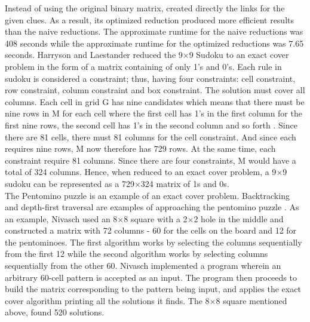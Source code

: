 \documentclass[a4paper,oneside,11pt]{report}
\begin{document}
	Instead of using the original binary matrix, \cite{Harrysson} created directly the links for the given clues. As a result, its optimized reduction produced more efficient results than the naive reductions. The approximate runtime for the naive reductions was 408 seconds while the approximate runtime for the optimized reductions was 7.65 seconds. Harryson and Laestander reduced the 9$\times$9 Sudoku to an exact cover problem in the form of a matrix containing of only 1’s and 0’s. Each rule in sudoku is considered a constraint; thus, having four constraints: cell constraint, row constraint, column constraint and box constraint. The solution must cover all columns. Each cell in grid G has nine candidates which means that there must be nine rows in M for each cell where the first cell has 1’s in the first column for the first nine rows, the second cell has 1’s in the second column and so forth \cite{Harrysson}. Since there are 81 cells, there must 81 columns for the cell constraint. And since each requires nine rows, M now therefore has 729 rows. At the same time, each constraint require 81 columns. Since there are four constraints, M would have a total of 324 columns. Hence, when reduced to an exact cover problem, a 9$\times$9 sudoku can be represented as a 729$\times$324 matrix of 1s and 0s.\\
	
		The Pentomino puzzle is an example of an exact cover problem. Backtracking and depth-first traversal are examples of approaching the pentomino puzzle \cite{Nivasch}. As an example, Nivasch used an 8$\times$8 square with a 2$\times$2 hole in the middle and constructed a matrix with 72 columns - 60 for the cells on the board and 12 for the pentominoes. The first algorithm works by selecting the columns sequentially from the first 12 while the second algorithm works by selecting columns sequentially from the other 60. Nivasch implemented a program wherein an arbitrary 60-cell pattern is accepted as an input. The program then proceeds to build the matrix corresponding to the pattern being input, and applies the exact cover algorithm printing all the solutions it finds. The 8$\times$8 square mentioned above, found 520 solutions.\\
		
\end{document}
